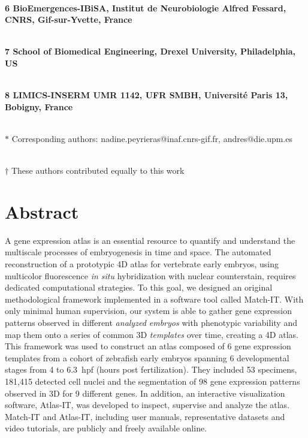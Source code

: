 \begin{flushleft}
\\

\bf{6} BioEmergences-IBiSA, Institut de Neurobiologie Alfred Fessard, CNRS, Gif-sur-Yvette, France

\\

\bf{7} School of Biomedical Engineering, Drexel University, Philadelphia, US

\\

\bf{8} LIMICS-INSERM UMR 1142, UFR SMBH, Universit{\'e} Paris 13, Bobigny, France

\\

$\ast$ Corresponding authors: nadine.peyrieras@inaf.cnrs-gif.fr, andres@die.upm.es

\\

$\dag$ These authors contributed equally to this work

\end{flushleft}




\section*{Abstract}



A gene expression atlas is an essential resource to quantify and understand the multiscale processes of embryogenesis in time and space. The automated reconstruction of a prototypic 4D atlas for vertebrate early embryos, using multicolor fluorescence \emph{in situ} hybridization with nuclear counterstain, requires dedicated computational strategies. To this goal, we designed an original methodological framework implemented in a software tool called Match-IT. With only minimal human supervision, our system is able to gather gene expression patterns observed in different \emph{analyzed embryos} with phenotypic variability and map them onto a series of common 3D \emph{templates} over time, creating a 4D atlas. This framework was used to construct an atlas composed of 6 gene expression templates from a cohort of zebrafish early embryos spanning 6 developmental stages from 4 to 6.3~hpf (hours post fertilization). They included 53 specimens, 181,415 detected cell nuclei and the segmentation of 98 gene expression patterns observed in 3D for 9 different genes. In addition, an interactive visualization software, Atlas-IT, was developed to inspect, supervise and analyze the atlas. Match-IT and Atlas-IT, including user manuals, representative datasets and video tutorials, are publicly and freely available online.

